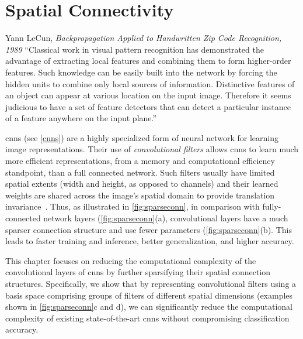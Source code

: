 \documentclass[thesis]{subfiles}
\begin{document}
	\chapter{Spatial Connectivity}\label{lowrankfilters}
	\begin{chapquote}{Yann LeCun, \textit{{\small{}Backpropagation Applied to Handwritten Zip Code Recognition}, 1989}}
        ``Classical work in visual pattern recognition has demonstrated the advantage of extracting local features and combining them to form higher-order features. Such knowledge can be easily built into the network by forcing the hidden units to combine only local sources of information. Distinctive features of an object can appear at various location on the input image. Therefore it seems judicious to have a set of feature detectors that can detect a particular instance of a feature anywhere on the input plane.''
    \end{chapquote}
    
    \glspl{cnn} (see \cref{cnns}) are a highly specialized form of neural network for learning image representations. Their use of \emph{convolutional filters} allows \glspl{cnn} to learn much more efficient representations, from a memory and computational efficiency standpoint, than a full connected network. Such filters usually have limited spatial extents (\ie width and height, as opposed to channels) and their learned weights are shared across the image's spatial domain to provide translation invariance~\citep{Fuk80,Lecun1998}.
    Thus, as illustrated in \cref{fig:sparseconn}, in comparison with fully-connected network layers (\cref{fig:sparseconn}(a), convolutional layers have a much sparser connection structure and use fewer parameters (\cref{fig:sparseconn}(b).
    This leads to faster training and inference, better generalization, and higher accuracy.
    
    This chapter focuses on reducing the computational complexity of the convolutional layers of \glspl{cnn} by further sparsifying their spatial connection structures.  Specifically, we show that by representing convolutional filters using a basis space comprising groups of filters of different spatial dimensions (examples shown in \cref{fig:sparseconn}c and d), we can significantly reduce the computational complexity of existing state-of-the-art \glspl{cnn} without compromising classification accuracy.
    
\end{document}

